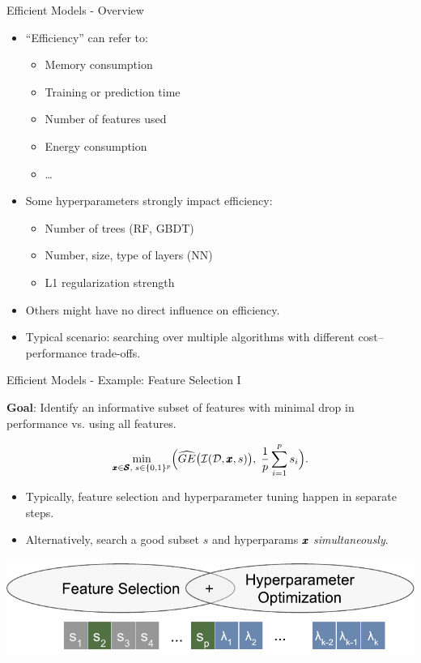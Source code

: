 \documentclass[11pt,compress,t,notes=noshow,xcolor=table]{beamer}
\newcommand{\inducer}{\mathcal{I}}
\begin{document}
\begin{vbframe}{Efficient Models - Overview}

\begin{itemize}
  \item “Efficiency” can refer to:
    \begin{itemize}
      \item Memory consumption
      \item Training or prediction time
      \item Number of features used
      \item Energy consumption
      \item \ldots
    \end{itemize}
  \item Some hyperparameters strongly impact efficiency:
    \begin{itemize}
      \item Number of trees (RF, GBDT)
      \item Number, size, type of layers (NN)
      \item L1 regularization strength
    \end{itemize}
  \item Others might have no direct influence on efficiency.
  \item Typical scenario: searching over multiple algorithms with different cost–performance trade-offs.
\end{itemize}

\end{vbframe}

\begin{vbframe}{Efficient Models - Example: Feature Selection I}

\textbf{Goal}: Identify an informative subset of features with minimal drop in performance vs. using all features.

\[
\min_{\conf\in \pcs,\; s\in \{0,1\}^p}
  \Bigl(
    \widehat{GE}\bigl(\inducer(\dataset,\conf,s)\bigr),\;
    \frac{1}{p}\sum_{i=1}^p s_i
  \Bigr).
\]

\begin{itemize}
  \item Typically, feature selection and hyperparameter tuning happen in separate steps.
  \item Alternatively, search a good subset $s$ and hyperparams $\pmb{x}$ \emph{simultaneously}.
\end{itemize}

\begin{center}
\includegraphics[width=0.5\linewidth]{slides/11-multicrit/figure_man/mosmafs_presentation_p14.pdf}
\end{center}

\end{vbframe}
\end{document}
